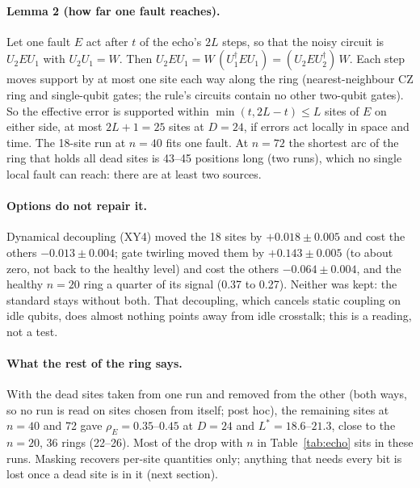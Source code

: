 \documentclass[11pt]{article}
\begin{document}
\paragraph{Lemma 2 (how far one fault reaches).} Let one fault $E$ act after $t$ of the echo's $2L$ steps, so that the
noisy circuit is $U_2EU_1$ with $U_2U_1=W$. Then $U_2EU_1=W\,(U_1^\dagger EU_1)=(U_2EU_2^\dagger)\,W$. Each step moves
support by at most one site each way along the ring (nearest-neighbour CZ ring and single-qubit gates; the rule's
circuits contain no other two-qubit gates). So the effective error is supported within $\min(t,2L-t)\le L$ sites of
$E$ on either side, at most $2L+1=25$ sites at $D=24$, if errors act locally in space and time. The 18-site run at
$n=40$ fits one fault. At $n=72$ the shortest arc of the ring that holds all dead sites is 43--45 positions long (two
runs), which no single local fault can reach: there are at least two sources.

\paragraph{Options do not repair it.} Dynamical decoupling (XY4) moved the 18 sites by $+0.018\pm0.005$ and cost the
others $-0.013\pm0.004$; gate twirling moved them by $+0.143\pm0.005$ (to about zero, not back to the healthy level)
and cost the others $-0.064\pm0.004$, and the healthy $n=20$ ring a quarter of its signal (0.37 to 0.27). Neither was
kept: the standard stays without both. That decoupling, which cancels static coupling on idle qubits, does almost
nothing points away from idle crosstalk; this is a reading, not a test.

\paragraph{What the rest of the ring says.} With the dead sites taken from one run and removed from the other (both
ways, so no run is read on sites chosen from itself; post hoc), the remaining sites at $n=40$ and 72 gave
$\rho_E=0.35$--$0.45$ at $D=24$ and $L^*=18.6$--$21.3$, close to the $n=20$, 36 rings (22--26). Most of the drop with
$n$ in Table~\ref{tab:echo} sits in these runs. Masking recovers per-site quantities only; anything that needs every
bit is lost once a dead site is in it (next section).
\end{document}
